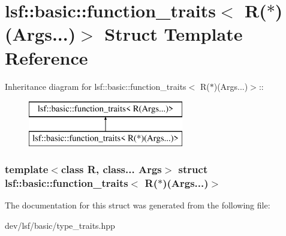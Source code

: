 \hypertarget{structlsf_1_1basic_1_1function__traits_3_01R_07_5_08_07Args_8_8_8_08_4}{
\section{lsf::basic::function\_\-traits$<$ R($\ast$)(Args...)$>$ Struct Template Reference}
\label{structlsf_1_1basic_1_1function__traits_3_01R_07_5_08_07Args_8_8_8_08_4}
}
Inheritance diagram for lsf::basic::function\_\-traits$<$ R($\ast$)(Args...)$>$::\begin{figure}[H]
\begin{center}
\leavevmode
\includegraphics[height=2cm]{structlsf_1_1basic_1_1function__traits_3_01R_07_5_08_07Args_8_8_8_08_4}
\end{center}
\end{figure}
\subsubsection*{template$<$class R, class... Args$>$ struct lsf::basic::function\_\-traits$<$ R($\ast$)(Args...)$>$}



The documentation for this struct was generated from the following file:\begin{DoxyCompactItemize}
\item 
dev/lsf/basic/type\_\-traits.hpp\end{DoxyCompactItemize}
